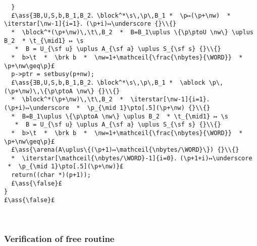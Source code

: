 \documentclass[12pt,a4paper]{article}
\makeatletter
\newcommand{\ml}[2][t]{\mbox{\mdseries\begin{tabular}[#1]{@{}L@{}}#2\end{tabular}}}
\newcommand{\ass}[1]{\ensuremath{{\color{blue}\left\{\ml[c]{#1}\right\}}}}
\newcommand{\iterstar}[2][]{\text{\LARGE $*$}^{#1}_{#2}}
\makeatother
\begin{document}
\begin{lstlisting}
  } 
  £\ass{∃B,U,S,b,B_1,B_2．\block^*\s\,\p\,B_1 *  \p↦(\p+\nw)  *  \iterstar[\nw-1]{i=1}．(\p+i)↦\underscore {}\\{}
  *  \block^*(\p+\nw)\,\t\,B_2  *  B=B_1\uplus \{\p\ptoU \nw\} \uplus B_2  * \t_{\mid1} ↦ \s 
   *  B = U_{\sf u} \uplus A_{\sf a} \uplus S_{\sf s} {}\\{}
  *  b>\t  *  \brk b  *  \nw=1+\mathceil{\frac{\nbytes}{\WORD}}  *  \p+\nw\geq\p}£ 
  p->ptr = setbusy(p+nw);
  £\ass{∃B,U,S,b,B_1,B_2．\block^*\s\,\p\,B_1 *  \ablock \p\,(\p+\nw)\,\{\p\ptoA \nw\} {}\\{}
  *  \block^*(\p+\nw)\,\t\,B_2  *  \iterstar[\nw-1]{i=1}．(\p+i)↦\underscore  *  \p_{\mid 1}\pto[.5](\p+\nw) {}\\{}
  *  B=B_1\uplus \{\p\ptoA \nw\} \uplus B_2  * \t_{\mid1} ↦ \s 
   *  B = U_{\sf u} \uplus A_{\sf a} \uplus S_{\sf s} {}\\{}
  *  b>\t  *  \brk b  *  \nw=1+\mathceil{\frac{\nbytes}{\WORD}}  *  \p+\nw\geq\p}£
  £\ass{\arena(A\uplus\{(\p+1)↦\mathceil{\nbytes/\WORD}\}) {}\\{}
  *  \iterstar[\mathceil{\nbytes/\WORD}-1]{i=0}．(\p+1+i)↦\underscore  *  \p_{\mid 1}\pto[.5](\p+\nw)}£
  return((char *)(p+1));
  £\ass{\false}£
}
£\ass{\false}£
\end{lstlisting}\ \\

\subsubsection*{Verification of free routine}
\end{document}
